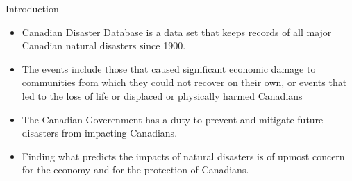 \begin{frame}{Introduction}
    \begin{itemize}
		\item Canadian Disaster Database is a data set that keeps records of all major Canadian natural disasters since 1900.
		\item The events include those that caused significant economic damage to communities from which they could not recover on their own, or events that led to the loss of life or displaced or physically harmed Canadians
		\item The Canadian Goverenment has a duty to prevent and mitigate future disasters from impacting Canadians. 
		\item Finding what predicts the impacts of natural disasters is of upmost concern for the economy and for the protection of Canadians.
    \end{itemize}
\end{frame}
